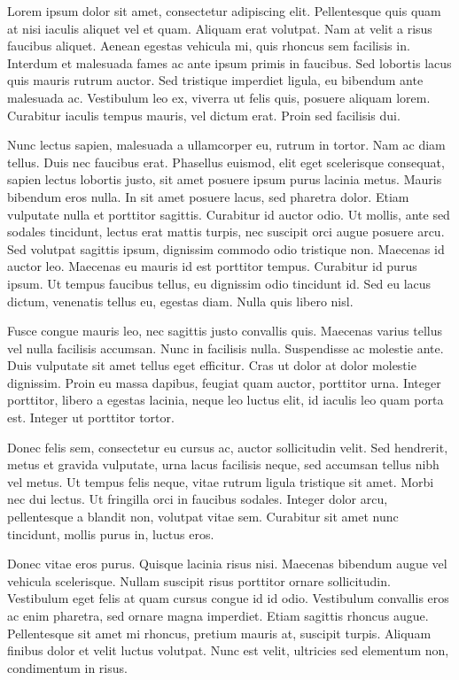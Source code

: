 \documentclass{UoYCSproject}
\begin{document}
Lorem ipsum dolor sit amet, consectetur adipiscing elit. Pellentesque quis quam at nisi iaculis aliquet vel et quam. Aliquam erat volutpat. Nam at velit a risus faucibus aliquet. Aenean egestas vehicula mi, quis rhoncus sem facilisis in. Interdum et malesuada fames ac ante ipsum primis in faucibus. Sed lobortis lacus quis mauris rutrum auctor. Sed tristique imperdiet ligula, eu bibendum ante malesuada ac. Vestibulum leo ex, viverra ut felis quis, posuere aliquam lorem. Curabitur iaculis tempus mauris, vel dictum erat. Proin sed facilisis dui.

Nunc lectus sapien, malesuada a ullamcorper eu, rutrum in tortor. Nam ac diam tellus. Duis nec faucibus erat. Phasellus euismod, elit eget scelerisque consequat, sapien lectus lobortis justo, sit amet posuere ipsum purus lacinia metus. Mauris bibendum eros nulla. In sit amet posuere lacus, sed pharetra dolor. Etiam vulputate nulla et porttitor sagittis. Curabitur id auctor odio. Ut mollis, ante sed sodales tincidunt, lectus erat mattis turpis, nec suscipit orci augue posuere arcu. Sed volutpat sagittis ipsum, dignissim commodo odio tristique non. Maecenas id auctor leo. Maecenas eu mauris id est porttitor tempus. Curabitur id purus ipsum. Ut tempus faucibus tellus, eu dignissim odio tincidunt id. Sed eu lacus dictum, venenatis tellus eu, egestas diam. Nulla quis libero nisl.

Fusce congue mauris leo, nec sagittis justo convallis quis. Maecenas varius tellus vel nulla facilisis accumsan. Nunc in facilisis nulla. Suspendisse ac molestie ante. Duis vulputate sit amet tellus eget efficitur. Cras ut dolor at dolor molestie dignissim. Proin eu massa dapibus, feugiat quam auctor, porttitor urna. Integer porttitor, libero a egestas lacinia, neque leo luctus elit, id iaculis leo quam porta est. Integer ut porttitor tortor.

Donec felis sem, consectetur eu cursus ac, auctor sollicitudin velit. Sed hendrerit, metus et gravida vulputate, urna lacus facilisis neque, sed accumsan tellus nibh vel metus. Ut tempus felis neque, vitae rutrum ligula tristique sit amet. Morbi nec dui lectus. Ut fringilla orci in faucibus sodales. Integer dolor arcu, pellentesque a blandit non, volutpat vitae sem. Curabitur sit amet nunc tincidunt, mollis purus in, luctus eros.

Donec vitae eros purus. Quisque lacinia risus nisi. Maecenas bibendum augue vel vehicula scelerisque. Nullam suscipit risus porttitor ornare sollicitudin. Vestibulum eget felis at quam cursus congue id id odio. Vestibulum convallis eros ac enim pharetra, sed ornare magna imperdiet. Etiam sagittis rhoncus augue. Pellentesque sit amet mi rhoncus, pretium mauris at, suscipit turpis. Aliquam finibus dolor et velit luctus volutpat. Nunc est velit, ultricies sed elementum non, condimentum in risus.
\end{document}
